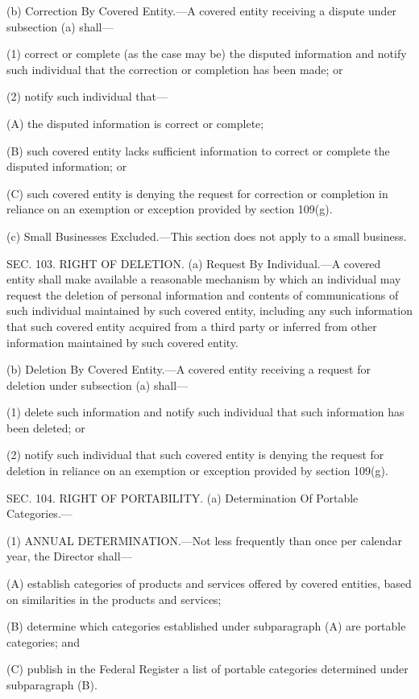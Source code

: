 (b) Correction By Covered Entity.—A covered entity receiving a dispute under subsection (a) shall—

(1) correct or complete (as the case may be) the disputed information and notify such individual that the correction or completion has been made; or

(2) notify such individual that—

(A) the disputed information is correct or complete;

(B) such covered entity lacks sufficient information to correct or complete the disputed information; or

(C) such covered entity is denying the request for correction or completion in reliance on an exemption or exception provided by section 109(g).

(c) Small Businesses Excluded.—This section does not apply to a small business.


SEC. 103. RIGHT OF DELETION.
(a) Request By Individual.—A covered entity shall make available a reasonable mechanism by which an individual may request the deletion of personal information and contents of communications of such individual maintained by such covered entity, including any such information that such covered entity acquired from a third party or inferred from other information maintained by such covered entity.

(b) Deletion By Covered Entity.—A covered entity receiving a request for deletion under subsection (a) shall—

(1) delete such information and notify such individual that such information has been deleted; or

(2) notify such individual that such covered entity is denying the request for deletion in reliance on an exemption or exception provided by section 109(g).


SEC. 104. RIGHT OF PORTABILITY.
(a) Determination Of Portable Categories.—

(1) ANNUAL DETERMINATION.—Not less frequently than once per calendar year, the Director shall—

(A) establish categories of products and services offered by covered entities, based on similarities in the products and services;

(B) determine which categories established under subparagraph (A) are portable categories; and

(C) publish in the Federal Register a list of portable categories determined under subparagraph (B).

